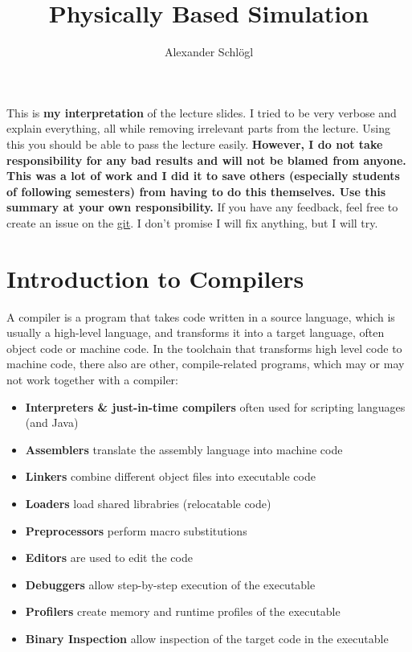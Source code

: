\documentclass{article}
\title{Physically Based Simulation}
\author{Alexander Schlögl}
\begin{document}
\maketitle

\tableofcontents

This is \textbf{my interpretation} of the lecture slides.
I tried to be very verbose and explain everything, all while removing irrelevant parts from the lecture.
Using this you should be able to pass the lecture easily.
\large{\textbf{However, I do not take responsibility for any bad results and will not be blamed from anyone.
This was a lot of work and I did it to save others (especially students of following semesters) from having to do this themselves.
Use this summary at your own responsibility.}}
If you have any feedback, feel free to create an issue on the \href{https://github.com/alxshine/lecture-notes}{git}.
I don't promise I will fix anything, but I will try.
\newpage

\section{Introduction to Compilers}
A compiler is a program that takes code written in a source language, which is usually a high-level language, and transforms it into a target language, often object code or machine code.
In the toolchain that transforms high level code to machine code, there also are other, compile-related programs, which may or may not work together with a compiler:
\begin{itemize}
	\item \textbf{Interpreters \& just-in-time compilers} often used for scripting languages (and Java)
	\item \textbf{Assemblers} translate the assembly language into machine code
	\item \textbf{Linkers} combine different object files into executable code
	\item \textbf{Loaders} load shared librabries (relocatable code)
	\item \textbf{Preprocessors} perform macro substitutions
	\item \textbf{Editors} are used to edit the code
	\item \textbf{Debuggers} allow step-by-step execution of the executable
	\item \textbf{Profilers} create memory and runtime profiles of the executable
	\item \textbf{Binary Inspection} allow inspection of the target code in the executable
\end{itemize}
\end{document}
